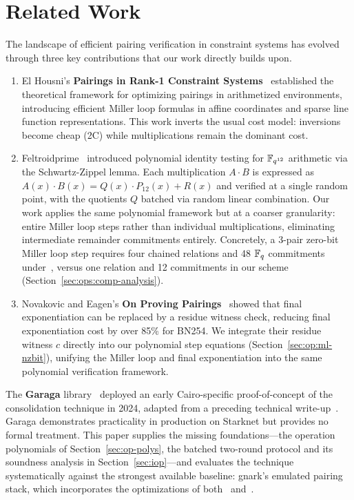 \section{Related Work}

The landscape of efficient pairing verification in constraint systems has evolved through three key contributions that our work directly builds upon.

\begin{enumerate}
	\item El Housni's \textbf{Pairings in Rank-1 Constraint Systems}~\cite{ACNS:ElHousni23} established the theoretical framework for optimizing pairings in arithmetized environments, introducing efficient Miller loop formulas in affine coordinates and sparse line function representations. This work inverts the usual cost model: inversions become cheap (2C) while multiplications remain the dominant cost.
	\item Feltroidprime~\cite{FXFM23} introduced polynomial identity testing for $\mathbb{F}_{q^{12}}$ arithmetic via the Schwartz-Zippel lemma. Each multiplication $A \cdot B$ is expressed as $A(x) \cdot B(x) = Q(x) \cdot P_{12}(x) + R(x)$ and verified at a single random point, with the quotients $Q$ batched via random linear combination. Our work applies the same polynomial framework but at a coarser granularity: entire Miller loop steps rather than individual multiplications, eliminating intermediate remainder commitments entirely. Concretely, a 3-pair zero-bit Miller loop step requires four chained relations and 48 $\mathbb{F}_q$ commitments under~\cite{FXFM23}, versus one relation and 12 commitments in our scheme (Section~\ref{sec:ops:comp-analysis}).
	\item Novakovic and Eagen's \textbf{On Proving Pairings}~\cite{EPRINT:NovEag24} showed that final exponentiation can be replaced by a residue witness check, reducing final exponentiation cost by over 85\% for BN254. We integrate their residue witness $c$ directly into our polynomial step equations (Section~\ref{sec:op:ml-nzbit}), unifying the Miller loop and final exponentiation into the same polynomial verification framework.
\end{enumerate}

The \textbf{Garaga} library~\cite{grg} deployed an early Cairo-specific proof-of-concept of the consolidation technique in 2024, adapted from a preceding technical write-up~\cite{cp24}. Garaga demonstrates practicality in production on Starknet but provides no formal treatment. This paper supplies the missing foundations---the operation polynomials of Section~\ref{sec:op-polys}, the batched two-round protocol and its soundness analysis in Section~\ref{sec:iop}---and evaluates the technique systematically against the strongest available baseline: gnark's emulated pairing stack, which incorporates the optimizations of both~\cite{ACNS:ElHousni23} and~\cite{EPRINT:NovEag24}.
